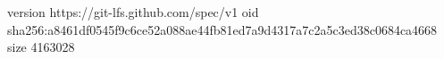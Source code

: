 version https://git-lfs.github.com/spec/v1
oid sha256:a8461df0545f9c6ce52a088ae44fb81ed7a9d4317a7c2a5c3ed38c0684ca4668
size 4163028
